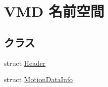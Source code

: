 \hypertarget{namespace_v_m_d}{}\section{V\+MD 名前空間}
\label{namespace_v_m_d}
\subsection*{クラス}
\begin{DoxyCompactItemize}
\item 
struct \mbox{\hyperlink{struct_v_m_d_1_1_header}{Header}}
\item 
struct \mbox{\hyperlink{struct_v_m_d_1_1_motion_data_info}{Motion\+Data\+Info}}
\end{DoxyCompactItemize}

